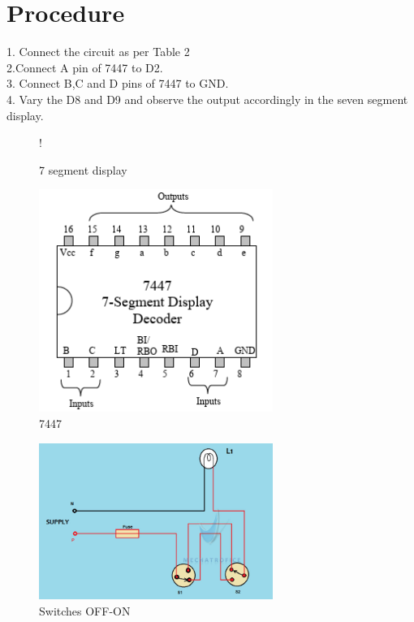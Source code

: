 \documentclass[journal,12pt,twocolumn]{IEEEtran}
\begin{document}
\section{Procedure}

1. Connect the circuit as per Table 2\\
2.Connect A pin of 7447 to D2.\\
3. Connect B,C and D pins of 7447 to GND.\\
4. Vary the D8 and D9 and observe the output 
accordingly in the seven segment display.

\begin{figure}[!h]
\begin{center}
 {!} {
%

}
\end{center}
\caption{7 segment display}
\label{fig:sevenseg}
\end{figure}
\begin{figure}
    \centering
    \includegraphics[width=3in]{ic7447.png}
    \caption{7447}
    \label{fig:circuit}
\end{figure}
\begin{figure}
    \centering
    \includegraphics[width=3in]{xnor.jpeg}
    \caption{Switches OFF-ON}
    \label{fig:circuit}
\end{figure}
\end{document}
